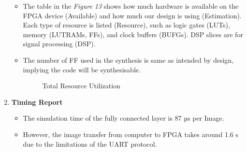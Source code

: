 \documentclass{article}
\begin{document}
\begin{enumerate}
\begin{itemize}
    \item The table in the \textit{Figure 13} shows how much hardware is available on the FPGA device (Available) and how much our design is using (Estimation). Each type of resource is listed (Resource), such as logic gates (LUTs), memory (LUTRAMs, FFs), and clock buffers (BUFGs). DSP slices are for signal processing (DSP).
    \item The number of FF used in the synthesis is same as intended by design, implying the code will be synthesisable.
     \begin{figure}[!hbt]
        \noindent{}
        \caption{Total Resource Utilization }
    \end{figure}
\end{itemize}
    \item  \textbf{Timing Report}
    \begin{itemize}
\item The simulation time of the fully connected layer is 87 µs per Image.
\item However, the image transfer from computer to FPGA takes around 1.6 s due to the limitations of the UART protocol.
\end{itemize}
\end{enumerate}
\end{document}
